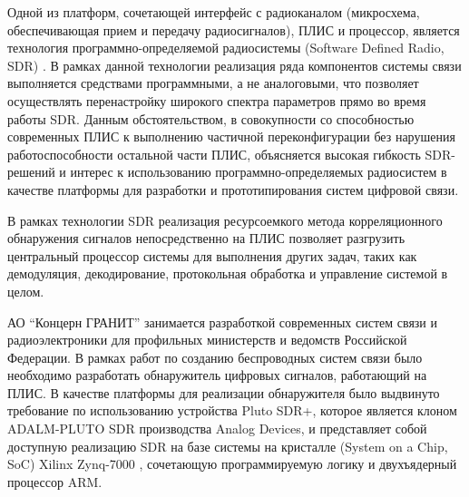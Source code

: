 Одной из платформ, сочетающей интерфейс с радиоканалом (микросхема, обеспечивающая прием и передачу радиосигналов), ПЛИС и процессор, является технология программно-определяемой радиосистемы (Software Defined Radio, SDR) \cite{adi_sdr_solutions}. В рамках данной технологии реализация ряда компонентов системы связи выполняется средствами программными, а не аналоговыми, что позволяет осуществлять перенастройку широкого спектра параметров прямо во время работы SDR. Данным обстоятельством, в совокупности со способностью современных ПЛИС к выполнению частичной переконфигурации без нарушения работоспособности остальной части ПЛИС, объясняется высокая гибкость SDR-решений и интерес к использованию программно-определяемых радиосистем в качестве платформы для разработки и прототипирования систем цифровой связи.

В рамках технологии SDR реализация ресурсоемкого метода корреляционного обнаружения сигналов непосредственно на ПЛИС позволяет разгрузить центральный процессор системы для выполнения других задач, таких как демодуляция, декодирование, протокольная обработка и управление системой в целом.

АО “Концерн ГРАНИТ”  занимается разработкой современных систем связи и радиоэлектроники для профильных министерств и ведомств Российской Федерации. В рамках работ по созданию беспроводных систем связи было необходимо разработать обнаружитель цифровых сигналов, работающий на ПЛИС. В качестве платформы для реализации обнаружителя было выдвинуто требование по использованию устройства Pluto SDR+, которое является клоном ADALM-PLUTO SDR \cite{adalm_pluto_board} производства Analog Devices, и представляет собой доступную реализацию SDR на базе системы на кристалле (System on a Chip, SoC) Xilinx Zynq-7000 \cite{zynq_7000_overview}, сочетающую программируемую логику и двухъядерный процессор ARM.


